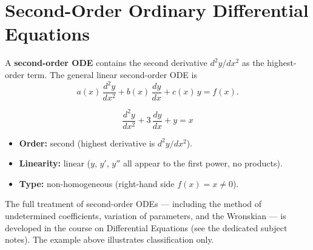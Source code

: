 \chapter{Second-Order Ordinary Differential Equations}

A \textbf{second-order ODE} contains the second derivative $d^2y/dx^2$ as the highest-order term. The general linear second-order ODE is
\[
  a(x)\,\frac{d^2y}{dx^2} + b(x)\,\frac{dy}{dx} + c(x)\,y = f(x).
\]

\begin{example}[Classification]
\[
  \frac{d^2y}{dx^2} + 3\,\frac{dy}{dx} + y = x
\]
\begin{itemize}
  \item \textbf{Order:} second (highest derivative is $d^2y/dx^2$).
  \item \textbf{Linearity:} linear ($y$, $y'$, $y''$ all appear to the first power, no products).
  \item \textbf{Type:} non-homogeneous (right-hand side $f(x) = x \neq 0$).
\end{itemize}
\end{example}

\begin{remark}
The full treatment of second-order ODEs — including the method of undetermined coefficients, variation of parameters, and the Wronskian — is developed in the course on Differential Equations (see the dedicated subject notes). The example above illustrates classification only.
\end{remark}
